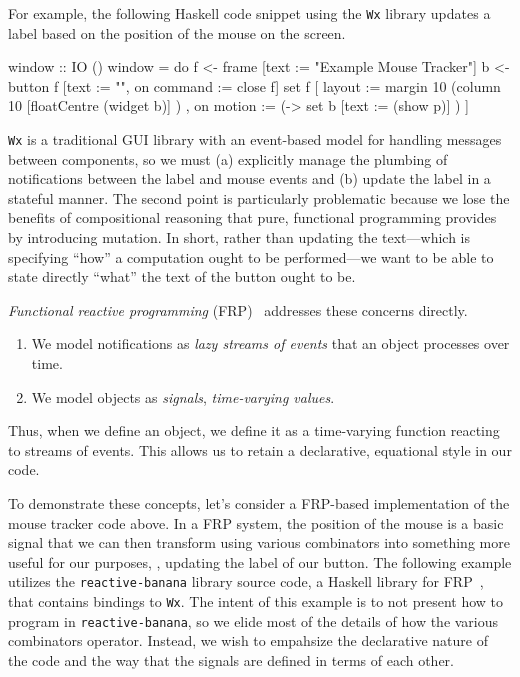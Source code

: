 For example, the following Haskell code snippet using the \texttt{Wx} library updates a label based on the position of the mouse on the screen.
\begin{haskellcode}
window :: IO ()
window = do
  f <- frame [text := "Example Mouse Tracker"]
  b <- button f [text := "", on command := close f]
  set f [ layout := margin 10 (column 10 [floatCentre (widget b)] )
        , on motion := (\p -> set b [text := (show p)] )
        ]
\end{haskellcode}
\texttt{Wx} is a traditional GUI library with an event-based model for handling messages between components, so we must (a) explicitly manage the plumbing of notifications between the label and mouse events and (b) update the label in a stateful manner.
The second point is particularly problematic because we lose the benefits of compositional reasoning that pure, functional programming provides by introducing mutation.
In short, rather than updating the text---which is specifying ``how'' a computation ought to be performed---we want to be able to state directly ``what'' the text of the button ought to be.

\emph{Functional reactive programming} (FRP)~\cite{elliott1997, czaplicki2013, finkbeiner2019, jeffrey2012} addresses these concerns directly.
\begin{enumerate}[itemsep=0pt]
  \item We model notifications as \emph{lazy streams of events} that an object processes over time.
  \item We model objects as \emph{signals}, \emph{time-varying values}.
\end{enumerate}
Thus, when we define an object, we define it as a time-varying function reacting to streams of events.
This allows us to retain a declarative, equational style in our code.

To demonstrate these concepts, let's consider a FRP-based implementation of the mouse tracker code above.
In a FRP system, the position of the mouse is a basic signal that we can then transform using various combinators into something more useful for our purposes, \eg, updating the label of our button.
The following example utilizes the \texttt{reactive-banana} library source code, a Haskell library for FRP~\cite{reactive-banana}, that contains bindings to \texttt{Wx}.
The intent of this example is to not present how to program in \texttt{reactive-banana}, so we elide most of the details of how the various combinators operator.
Instead, we wish to empahsize the declarative nature of the code and the way that the signals are defined in terms of each other.

